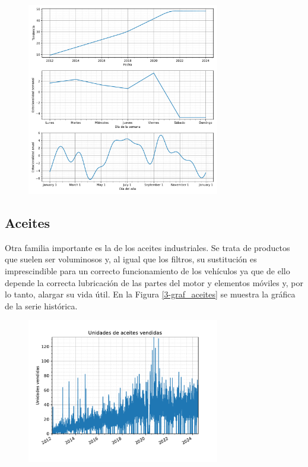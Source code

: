 \begin{figure}[H]
	{\includegraphics[width=0.75\textwidth]{imagenes/comps_filtros.pdf}}
\end{figure}

\subsection{Aceites}

Otra familia importante es la de los aceites industriales. Se trata de productos que suelen ser voluminosos y, al igual que los filtros, su sustitución es imprescindible para un correcto funcionamiento de los vehículos ya que de ello depende la correcta lubricación de las partes del motor y elementos móviles y, por lo tanto, alargar su vida útil. En la Figura \ref*{3-graf_aceites} se muestra la gráfica de la serie histórica.

\begin{figure}[H]
	{\includegraphics[width=0.75\textwidth]{imagenes/grafica_aceites.pdf}}
\end{figure}

